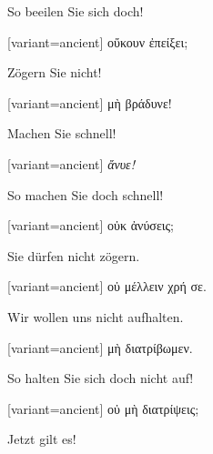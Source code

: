 So beeilen Sie sich doch! 

\switchcolumn

\begin{greek}[variant=ancient]%
οὔκουν ἐπείξει;

\end{greek}%
\switchcolumn*

Zögern Sie nicht! 

\switchcolumn

\begin{greek}[variant=ancient]%
μὴ βράδυνε!

\end{greek}%
\switchcolumn*

Machen Sie schnell! 

\switchcolumn

\begin{greek}[variant=ancient]%
\emph{ἄνυε!}

\end{greek}%
\switchcolumn*

So machen Sie doch schnell! 

\switchcolumn

\begin{greek}[variant=ancient]%
οὐκ ἀνύσεις;

\end{greek}%
\switchcolumn*

Sie dürfen nicht zögern. 

\switchcolumn

\begin{greek}[variant=ancient]%
οὐ μέλλειν χρή σε.

\end{greek}%
\switchcolumn*

Wir wollen uns nicht aufhalten. 

\switchcolumn

\begin{greek}[variant=ancient]%
μὴ διατρίβωμεν.

\end{greek}%
\switchcolumn*

So halten Sie sich doch nicht auf! 

\switchcolumn

\begin{greek}[variant=ancient]%
οὐ μὴ διατρίψεις;

\end{greek}%
\switchcolumn*

Jetzt gilt es! 

\switchcolumn

